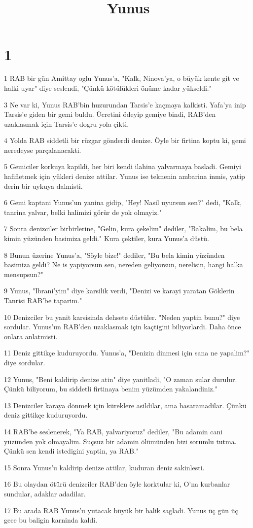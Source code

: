 

\title{Yunus}


\chapter{1}

\par 1 RAB bir gün Amittay oglu Yunus'a, "Kalk, Ninova'ya, o büyük kente git ve halki uyar" diye seslendi, "Çünkü kötülükleri önüme kadar yükseldi."
\par 3 Ne var ki, Yunus RAB'bin huzurundan Tarsis'e kaçmaya kalkisti. Yafa'ya inip Tarsis'e giden bir gemi buldu. Ücretini ödeyip gemiye bindi, RAB'den uzaklasmak için Tarsis'e dogru yola çikti.
\par 4 Yolda RAB siddetli bir rüzgar gönderdi denize. Öyle bir firtina koptu ki, gemi neredeyse parçalanacakti.
\par 5 Gemiciler korkuya kapildi, her biri kendi ilahina yalvarmaya basladi. Gemiyi hafifletmek için yükleri denize attilar. Yunus ise teknenin ambarina inmis, yatip derin bir uykuya dalmisti.
\par 6 Gemi kaptani Yunus'un yanina gidip, "Hey! Nasil uyursun sen?" dedi, "Kalk, tanrina yalvar, belki halimizi görür de yok olmayiz."
\par 7 Sonra denizciler birbirlerine, "Gelin, kura çekelim" dediler, "Bakalim, bu bela kimin yüzünden basimiza geldi." Kura çektiler, kura Yunus'a düstü.
\par 8 Bunun üzerine Yunus'a, "Söyle bize!" dediler, "Bu bela kimin yüzünden basimiza geldi? Ne is yapiyorsun sen, nereden geliyorsun, nerelisin, hangi halka mensupsun?"
\par 9 Yunus, "Ibrani'yim" diye karsilik verdi, "Denizi ve karayi yaratan Göklerin Tanrisi RAB'be taparim."
\par 10 Denizciler bu yanit karsisinda dehsete düstüler. "Neden yaptin bunu?" diye sordular. Yunus'un RAB'den uzaklasmak için kaçtigini biliyorlardi. Daha önce onlara anlatmisti.
\par 11 Deniz gittikçe kuduruyordu. Yunus'a, "Denizin dinmesi için sana ne yapalim?" diye sordular.
\par 12 Yunus, "Beni kaldirip denize atin" diye yanitladi, "O zaman sular durulur. Çünkü biliyorum, bu siddetli firtinaya benim yüzümden yakalandiniz."
\par 13 Denizciler karaya dönmek için küreklere asildilar, ama basaramadilar. Çünkü deniz gittikçe kuduruyordu.
\par 14 RAB'be seslenerek, "Ya RAB, yalvariyoruz" dediler, "Bu adamin cani yüzünden yok olmayalim. Suçsuz bir adamin ölümünden bizi sorumlu tutma. Çünkü sen kendi istedigini yaptin, ya RAB."
\par 15 Sonra Yunus'u kaldirip denize attilar, kuduran deniz sakinlesti.
\par 16 Bu olaydan ötürü denizciler RAB'den öyle korktular ki, O'na kurbanlar sundular, adaklar adadilar.
\par 17 Bu arada RAB Yunus'u yutacak büyük bir balik sagladi. Yunus üç gün üç gece bu baligin karninda kaldi.

